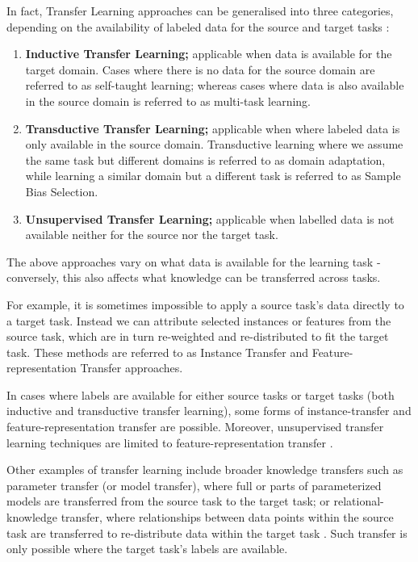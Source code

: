 In fact, Transfer Learning approaches can be generalised into three categories, depending on the availability of labeled data for the source and target tasks \citep{panyang2010}:
\begin{enumerate}  
\item \textbf{Inductive Transfer Learning;} applicable when data is available for the target domain. Cases where there is no data for the source domain are referred to as self-taught learning; whereas cases where data is also available in the source domain is referred to as multi-task learning.




\item \textbf{Transductive Transfer Learning;} applicable when where labeled data is only available in the source domain. Transductive learning where we assume the same task but different domains is referred to as domain adaptation, while learning a similar domain but a different task is referred to as Sample Bias Selection.  

\item \textbf{Unsupervised Transfer Learning;} applicable when labelled data is not available neither for the source nor the target task.
\end{enumerate}

The above approaches vary on what data is available for the learning task - conversely, this also affects what knowledge can be transferred across tasks. 

For example, it is sometimes impossible to apply a source task's data directly to a target task. Instead we can attribute selected instances or features from the source task, which are in turn re-weighted and re-distributed to fit the target task. These methods are referred to as Instance Transfer and Feature-representation Transfer approaches.

In cases where labels are available for either source tasks or target tasks (both inductive and transductive transfer learning), some forms of instance-transfer and feature-representation transfer are possible. Moreover, unsupervised transfer learning techniques are limited to feature-representation transfer \citep{panyang2010}. 

Other examples of transfer learning include broader knowledge transfers such as parameter transfer (or model transfer), where full or parts of parameterized models are transferred from the source task to the target task; or relational-knowledge transfer, where relationships between data points within the source task are transferred to re-distribute data within the target task \citep{cook2013}.   Such transfer is only possible where the target task's labels are available.


